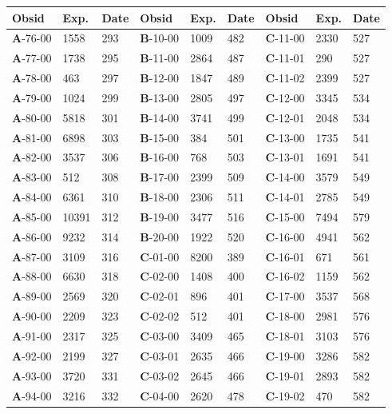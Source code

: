 \begin{table*}
\centering
\begin{tabular}{lllllllll}
\hline
\hline
\scriptsize Obsid&\scriptsize Exp.&\scriptsize Date&\scriptsize Obsid&\scriptsize Exp.&\scriptsize Date&\scriptsize Obsid&\scriptsize Exp.&\scriptsize Date\\
\hline
\textbf{A}-76-00&1558&293&\textbf{B}-10-00&1009&482&\textbf{C}-11-00&2330&527\\
\textbf{A}-77-00&1738&295&\textbf{B}-11-00&2864&487&\textbf{C}-11-01&290&527\\
\textbf{A}-78-00&463&297&\textbf{B}-12-00&1847&489&\textbf{C}-11-02&2399&527\\
\textbf{A}-79-00&1024&299&\textbf{B}-13-00&2805&497&\textbf{C}-12-00&3345&534\\
\textbf{A}-80-00&5818&301&\textbf{B}-14-00&3741&499&\textbf{C}-12-01&2048&534\\
\textbf{A}-81-00&6898&303&\textbf{B}-15-00&384&501&\textbf{C}-13-00&1735&541\\
\textbf{A}-82-00&3537&306&\textbf{B}-16-00&768&503&\textbf{C}-13-01&1691&541\\
\textbf{A}-83-00&512&308&\textbf{B}-17-00&2399&509&\textbf{C}-14-00&3579&549\\
\textbf{A}-84-00&6361&310&\textbf{B}-18-00&2306&511&\textbf{C}-14-01&2785&549\\
\textbf{A}-85-00&10391&312&\textbf{B}-19-00&3477&516&\textbf{C}-15-00&7494&579\\
\textbf{A}-86-00&9232&314&\textbf{B}-20-00&1922&520&\textbf{C}-16-00&4941&562\\
\textbf{A}-87-00&3109&316&\textbf{C}-01-00&8200&389&\textbf{C}-16-01&671&561\\
\textbf{A}-88-00&6630&318&\textbf{C}-02-00&1408&400&\textbf{C}-16-02&1159&562\\
\textbf{A}-89-00&2569&320&\textbf{C}-02-01&896&401&\textbf{C}-17-00&3537&568\\
\textbf{A}-90-00&2209&323&\textbf{C}-02-02&512&401&\textbf{C}-18-00&2981&576\\
\textbf{A}-91-00&2317&325&\textbf{C}-03-00&3409&465&\textbf{C}-18-01&3103&576\\
\textbf{A}-92-00&2199&327&\textbf{C}-03-01&2635&466&\textbf{C}-19-00&3286&582\\
\textbf{A}-93-00&3720&331&\textbf{C}-03-02&2645&466&\textbf{C}-19-01&2893&582\\
\textbf{A}-94-00&3216&332&\textbf{C}-04-00&2620&478&\textbf{C}-19-02&470&582\\

\end{tabular}
\end{table*}
